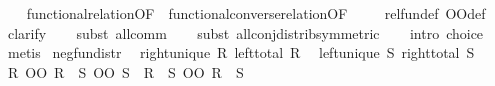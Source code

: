 \begin{isabellebody}
%
\isadelimproof
\ \ %
\endisadelimproof
%
\isatagproof
{}\isamarkupfalse%
\ functional{\isacharunderscore}{\kern0pt}relation{\isacharbrackleft}{\kern0pt}OF\ {}{\isacharbrackright}{\kern0pt}\ functional{\isacharunderscore}{\kern0pt}converse{\isacharunderscore}{\kern0pt}relation{\isacharbrackleft}{\kern0pt}OF\ {}{\isacharbrackright}{\kern0pt}\isanewline
\ \ \isamarkupfalse%
\ rel{\isacharunderscore}{\kern0pt}fun{\isacharunderscore}{\kern0pt}def\ OO{\isacharunderscore}{\kern0pt}def\isanewline
\ \ \isamarkupfalse%
\ clarify\isanewline
\ \ \isamarkupfalse%
\ {\isacharparenleft}{\kern0pt}subst\ all{\isacharunderscore}{\kern0pt}comm{\isacharparenright}{\kern0pt}\isanewline
\ \ \isamarkupfalse%
\ {\isacharparenleft}{\kern0pt}subst\ all{\isacharunderscore}{\kern0pt}conj{\isacharunderscore}{\kern0pt}distrib{\isacharbrackleft}{\kern0pt}symmetric{\isacharbrackright}{\kern0pt}{\isacharparenright}{\kern0pt}\isanewline
\ \ \isamarkupfalse%
\ {\isacharparenleft}{\kern0pt}intro\ choice{\isacharparenright}{\kern0pt}\isanewline
\ \ \isamarkupfalse%
\ metis%
\endisatagproof
{\isafoldproof}%
%
\isadelimproof
\isanewline
%
\endisadelimproof
\isanewline
{}\isamarkupfalse%
\ neg{\isacharunderscore}{\kern0pt}fun{\isacharunderscore}{\kern0pt}distr{}{\isacharcolon}{\kern0pt}\isanewline
{}\ {}{\isacharcolon}{\kern0pt}\ {\isachardoublequoteopen}right{\isacharunderscore}{\kern0pt}unique\ R{\isacharprime}{\kern0pt}{\isachardoublequoteclose}\ {\isachardoublequoteopen}left{\isacharunderscore}{\kern0pt}total\ R{\isacharprime}{\kern0pt}{\isachardoublequoteclose}\isanewline
{}\ {}{\isacharcolon}{\kern0pt}\ {\isachardoublequoteopen}left{\isacharunderscore}{\kern0pt}unique\ S{\isacharprime}{\kern0pt}{\isachardoublequoteclose}\ {\isachardoublequoteopen}right{\isacharunderscore}{\kern0pt}total\ S{\isacharprime}{\kern0pt}{\isachardoublequoteclose}\isanewline
{}\ {\isachardoublequoteopen}{\isacharparenleft}{\kern0pt}R\ OO\ R{\isacharprime}{\kern0pt}\ {\isacharequal}{\kern0pt}{\isacharequal}{\kern0pt}{\isacharequal}{\kern0pt}{\isachargreater}{\kern0pt}\ S\ OO\ S{\isacharprime}{\kern0pt}{\isacharparenright}{\kern0pt}\ {\isasymle}\ {\isacharparenleft}{\kern0pt}{\isacharparenleft}{\kern0pt}R\ {\isacharequal}{\kern0pt}{\isacharequal}{\kern0pt}{\isacharequal}{\kern0pt}{\isachargreater}{\kern0pt}\ S{\isacharparenright}{\kern0pt}\ OO\ {\isacharparenleft}{\kern0pt}R{\isacharprime}{\kern0pt}\ {\isacharequal}{\kern0pt}{\isacharequal}{\kern0pt}{\isacharequal}{\kern0pt}{\isachargreater}{\kern0pt}\ S{\isacharprime}{\kern0pt}{\isacharparenright}{\kern0pt}{\isacharparenright}{\kern0pt}{\isachardoublequoteclose}\isanewline

\end{isabellebody}
